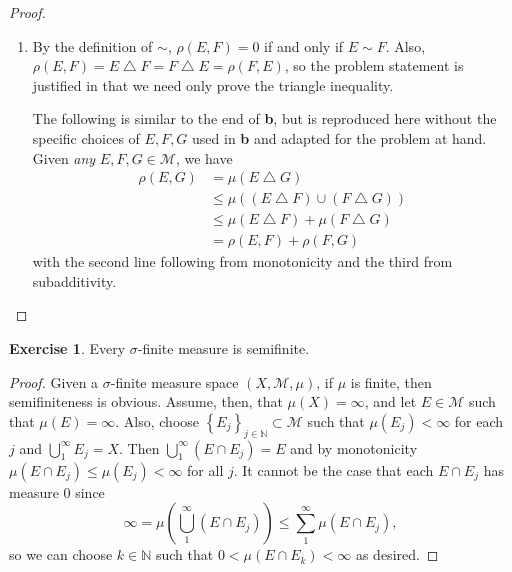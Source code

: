 \documentclass{article}
\theoremstyle{definition}
\newtheorem{ex}{Exercise}
\begin{document}
\begin{proof}
\begin{enumerate}[label=\textbf{\alph*.}]
		      From this, we use monotonicity and subadditivity (respectively) to get \begin{align*}
			      \mu(E \bigtriangleup G) & \leq \mu((E \bigtriangleup F) \cup (F \bigtriangleup G)) \\
			                              & \leq \mu(E \bigtriangleup F) + \mu(F \bigtriangleup G)   \\
			                              & = 0,
		      \end{align*}
		      so $\mu(E \bigtriangleup G) = 0$.
		\item By the definition of $\sim$, $\rho(E, F) = 0$ if and only if $E \sim F$.
		      Also, $\rho(E, F) = E \bigtriangleup F = F \bigtriangleup E = \rho(F, E)$, so the problem statement is justified in that we need only prove the triangle inequality.

		      The following is similar to the end of \textbf{b}, but is reproduced here without the specific choices of $E, F, G$ used in \textbf{b} and adapted for the problem at hand.
		      Given \textit{any} $E, F, G \in \mathscr{M}$, we have \begin{align*}
			      \rho(E, G) & = \mu(E \bigtriangleup G)                                \\
			                 & \leq \mu((E \bigtriangleup F) \cup (F \bigtriangleup G)) \\
			                 & \leq \mu(E \bigtriangleup F) + \mu(F \bigtriangleup G)   \\
			                 & = \rho(E, F) + \rho(F, G)
		      \end{align*}
		      with the second line following from monotonicity and the third from subadditivity.
	\end{enumerate}
\end{proof}

\begin{ex}
	Every $\sigma$-finite measure is semifinite.
\end{ex}
\begin{proof}
	Given a $\sigma$-finite measure space $(X, \mathscr{M}, \mu)$, if $\mu$ is finite, then semifiniteness is obvious.
	Assume, then, that $\mu(X) = \infty$, and let $E \in \mathscr{M}$ such that $\mu(E) = \infty$.
	Also, choose $\left\lbrace E_j \right\rbrace_{j \in \mathbb{N}} \subset \mathscr{M}$ such that $\mu(E_j) < \infty$ for each $j$ and $\bigcup _{1}^{\infty}E_j = X$.
	Then $\bigcup _{1}^{\infty} (E \cap E_j) = E$ and by monotonicity $\mu(E \cap E_j) \leq \mu(E_j) < \infty$ for all $j$.
	It cannot be the case that each $E \cap E_j$ has measure $0$ since \begin{equation*}
		\infty = \mu \left( \bigcup _{1}^{\infty}(E \cap E_j) \right) \leq \sum _{1}^{\infty}\mu(E \cap E_j),
	\end{equation*}
	so we can choose $k \in \mathbb{N}$ such that $0 < \mu(E \cap E_k) < \infty$ as desired.
\end{proof}
\end{document}
